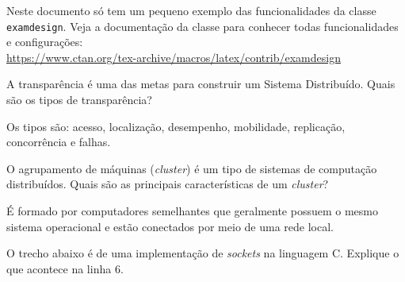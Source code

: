 \documentclass[11pt]{examdesign}
\begin{document}
\begin{exampreface}

\begin{nota}
Neste documento só tem um pequeno exemplo das funcionalidades da classe \texttt{examdesign}. Veja a documentação da classe para conhecer todas funcionalidades e configurações: \\\url{https://www.ctan.org/tex-archive/macros/latex/contrib/examdesign}
\end{nota}

\end{exampreface}



\begin{shortanswer}[title={Questões discursivas},rearrange=yes,resetcounter=no]

\begin{question}[10 pontos]
A transparência é uma das metas para construir um Sistema Distribuído. Quais são os tipos de transparência?
	\begin{answer}
	Os tipos são: acesso, localização, desempenho, mobilidade, replicação, concorrência e falhas.
	\end{answer}
\end{question}

\begin{question}[20 pontos]
O agrupamento de máquinas (\textit{cluster}) é um tipo de sistemas de computação distribuídos. Quais são as principais características de um \textit{cluster}?
	\begin{answer}
	É formado por computadores semelhantes que geralmente possuem o mesmo sistema operacional e estão conectados por meio de uma rede local.
	\end{answer}
\end{question}

\begin{question}[30 pontos]
O trecho abaixo é de uma implementação de \textit{sockets} na linguagem C. Explique o que acontece na linha 6.
%
%
\end{question}

\end{shortanswer}
\end{document}
